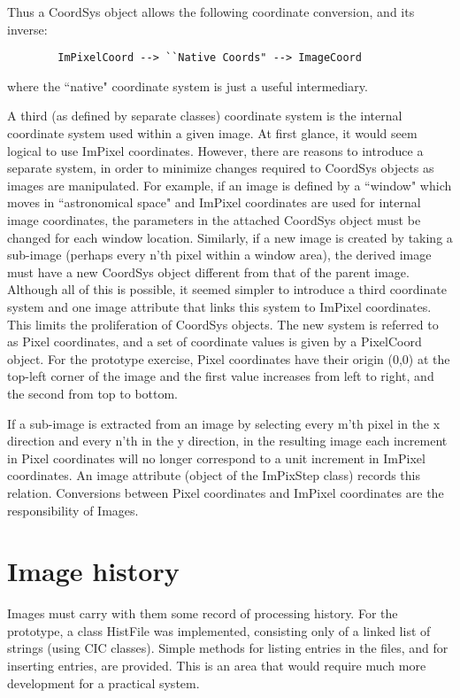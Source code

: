         Thus a CoordSys object allows the following coordinate conversion,
and its inverse:
\begin{verbatim}
        ImPixelCoord --> ``Native Coords" --> ImageCoord  
\end{verbatim}
where the ``native" coordinate system is just a useful intermediary.


        A third (as defined by separate classes) coordinate system is the
internal coordinate system used within a given image. At first glance, it would
seem logical to use ImPixel coordinates. However, there are reasons to 
introduce a separate system, in order to minimize changes required to
CoordSys objects as images are manipulated. For example, if an image is 
defined by a ``window" which moves in ``astronomical space" and ImPixel
coordinates are used for internal image coordinates, the parameters in the
attached CoordSys object must be changed for each window location. Similarly,
if a new image is created by taking a sub-image (perhaps every n'th
pixel within a window area), the derived image must have a new CoordSys
object different from that of the parent image. Although all of this is
possible, it seemed simpler to introduce a third coordinate system and one
image attribute that links this system to ImPixel coordinates. This limits
the proliferation of CoordSys objects. The new system is referred to as
Pixel coordinates, and a set of coordinate values is given by a PixelCoord
object. For the prototype exercise, Pixel coordinates have their origin
(0,0) at the top-left corner of the image and the first value increases
from left to right, and the second from top to bottom.

If a sub-image is extracted from an image by selecting every
m'th pixel in the x direction and every n'th in the y direction, in the
resulting image each increment in Pixel coordinates will no longer
correspond to a unit increment in ImPixel coordinates. An image attribute
(object of the ImPixStep class) records this relation. Conversions
between Pixel coordinates and ImPixel coordinates are the responsibility
of Images.


\section{Image history}

        Images must carry with them some record of processing history. For
the prototype, a class HistFile was implemented, consisting only of a linked
list of strings (using CIC classes). Simple methods for listing entries in
the files, and for inserting entries, are provided. This is an area that
would require much more development for a practical system.



